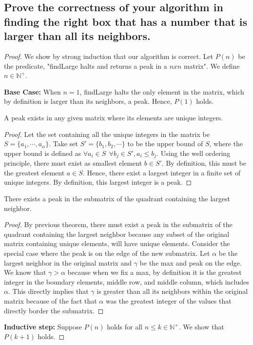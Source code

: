 \documentclass[11pt]{scrartcl}
\begin{document}
\subsection{
	Prove the correctness of your algorithm in finding the right box that has a number
	that is larger than all its neighbors.
}
\begin{proof}
	We show by strong induction that our algorithm is correct. Let $P(n)$ be the predicate,
	"findLarge halts and returns a peak in a $nxn$ matrix".
	We define $n \in \mathbb{N^{+}}$.
	\par \textbf{Base Case:} When $n = 1$, findLarge halts the only element in the matrix, which by definition
	is larger than its neighbors, a peak. Hence, $P(1)$ holds.
	\begin{theorem*}
		A peak exists in any given matrix where its elements are unique integers. 
		\begin{proof}
			Let the set 
			containing all the unique integers in the matrix be $S = \{a_1, \cdots, a_\alpha\}$. 	
			Take set $S' = \{b_1, b_2, \cdots\}$ to be the upper bound of $S$, 
			where the upper bound is defined as $ \forall a_i \in S \ \ \forall b_j \in S', a_i \leq b_j$.
			Using the well ordering principle, there must exist as smallest element $b \in S'$.
			By definition, this must be the greatest element $a \in S$. 
			Hence, there exist a largest integer in a finite set of unique integers. 
			By definition, this largest integer is a peak. 	
		\end{proof}
	\end{theorem*}
	\begin{corollary*}
		There exists a peak in the submatrix of the quadrant containing the largest neighbor.
		\begin{proof}
			By previous theorem, there must exist a peak in the submatrix of the quadrant containing the largest neighbor
			because any subset of the original matrix containing unique elements, will have unique elements. Consider the 
			special case where the peak is on the edge of the new submatrix. Let $\alpha$ be the largest neighbor in the original 
			matrix and $\gamma$ be the max and peak on the edge. We know that $\gamma > \alpha$ because when we fix a max, 
			by definition it is the
			greatest integer in the boundary elements, middle row, and middle column, which includes
			$\alpha$. This directly implies that $\gamma$
			is greater than all its neighbors within the original matrix because of the fact that $\alpha$ was the
			greatest integer of the values that directly border the submatrix. 
		\end{proof}
	\end{corollary*}	
	\par \textbf{Inductive step:} Suppose $P(n)$ holds for all $n \leq k \in \mathbb{N}^{+}$. We show that $P(k+1)$ holds.
	

\end{proof}
\end{document}
